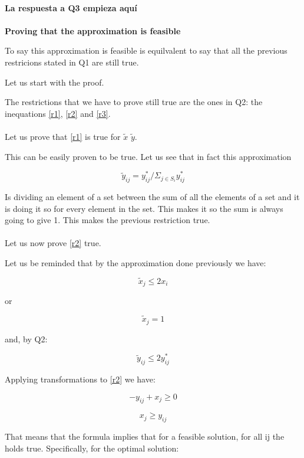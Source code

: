 \paragraph{}

\textbf{La respuesta a Q3 empieza aquí}
\\ \\
\textbf{Proving that the approximation is feasible}

To say this approximation is feasible is equilvalent to say that all
the previous restricions stated in Q1 are still true.

Let us start with the proof.

The restrictions that we have to prove still true are the ones in Q2: 
the inequations \ref{r1}, \ref{r2} and \ref{r3}.

\paragraph{}

Let us prove that \ref{r1} is true for $\tilde{x}$ $\tilde{y}$.

This can be easily proven to be true. 
Let us see that in fact this approximation

  \[ \tilde{y}_{ij} = y^*_{ij}/\Sigma_{j \in S_{i}} y^*_{ij} \]

Is dividing an element of a set between the sum of all the elements of a set
and it is doing it so for every element in the set. This makes it so the sum
is always going to give 1. This makes the previous restriction true.

\paragraph{}

Let us now prove \ref{r2} true.

Let us be reminded that by the approximation done previously we have:

  \[ \tilde{x}_{j} \leq 2x_{i} \]

or

  \[ \tilde{x}_{j} = 1 \]

and, by Q2:
  
  \[ \tilde{y}_{ij} \leq 2y^*_{ij} \]

Applying transformations to \ref{r2} we have:

  \[ -y_{ij} + x_{j} \geq 0 \]

  \[ x_{j} \geq y_{ij} \]

That means that the formula implies that for a feasible solution,
for all ij the holds true. 
Specifically, for the optimal solution:

